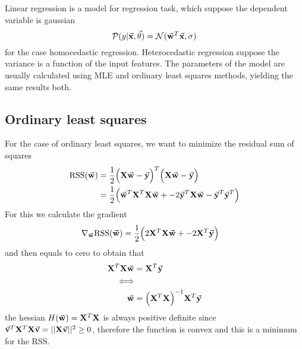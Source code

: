 \documentclass[../../main.tex]{subfiles}
\begin{document}
Linear regression is a model for regression task, which suppose the dependent variable is gaussian
\begin{equation*}
    \p(y|\vec{x},\vec{\theta}) = \normal(\vec{w}^T\vec{x},\sigma)
\end{equation*}
for the case homocedastic regression. Heterocedastic regression suppose the variance is a function of the input features. The parameters of the model are usually calculated using MLE and ordinary least squares methods, yielding the same results both. 
\subsection{Ordinary least squares}
For the case of ordinary least squares, we want to minimize the residual sum of squares
\begin{align*}
    \text{RSS}(\vec{w})
    &=\frac{1}{2}\Big(\mat{X}\vec{w}-\vec{y}\Big)^T \Big(\mat{X}\vec{w}-\vec{y}\Big)\\
    &=\frac{1}{2}\Big(
        \vec{w}^T\mat{X}^T\mat{X}\vec{w}+
        -2\vec{y}^T\mat{X}\vec{w}-\vec{y}^T\vec{y}^T
    \Big)\\
\end{align*}
For this we calculate the gradient
\begin{align*}
    \nabla_{\vec{w}} \text{RSS}(\vec{w})
    &=\frac{1}{2}\Big(
        2\mat{X}^T\mat{X}\vec{w}+
        -2\mat{X}^T\vec{y}\Big)
\end{align*}
and then equals to cero to obtain that
\begin{align*}
    \mat{X}^T\mat{X}\vec{w} &= \mat{X}^T\vec{y}\\ 
    \Longleftrightarrow&\\
    \vec{w} &= \Big(\mat{X}^T\mat{X}\Big)^{-1}\mat{X}^T\vec{y}
\end{align*}
the hessian $H(\vec{w})=\mat{X}^T\mat{X}$ is always positive definite since $\vec{v}^T\mat{X}^T\mat{X}\vec{v}=||\mat{X}\vec{v}||^2\ge0$, therefore the function is convex and this is a minimum for the $\text{RSS}$.
\end{document}
